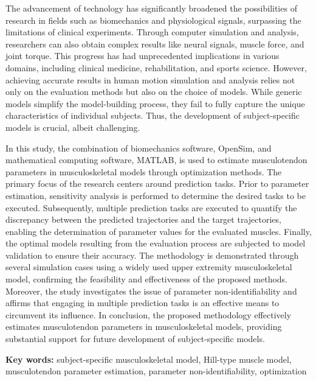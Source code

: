 \begin{abstractEN}

The advancement of technology has significantly broadened the possibilities of research in fields 
such as biomechanics and physiological signals, surpassing the limitations of clinical experiments. 
Through computer simulation and analysis, researchers can also obtain complex results like neural 
signals, muscle force, and joint torque. 
This progress has had unprecedented implications in various domains, including clinical medicine, 
rehabilitation, and sports science. 
However, achieving accurate results in human motion simulation and analysis relies not only on 
the evaluation methods but also on the choice of models. 
While generic models simplify the model-building process, they fail to fully capture the unique 
characteristics of individual subjects. 
Thus, the development of subject-specific models is crucial, albeit challenging.

In this study, the combination of biomechanics software, OpenSim, and mathematical 
computing software, MATLAB, is used to estimate musculotendon parameters in musculoskeletal models 
through optimization methods.
The primary focus of the research centers around prediction tasks. 
Prior to parameter estimation, sensitivity analysis is performed to determine the desired tasks to 
be executed. 
Subsequently, multiple prediction tasks are executed to quantify the discrepancy between the 
predicted trajectories and the target trajectories, enabling the determination of parameter 
values for the evaluated muscles.
Finally, the optimal models resulting from the evaluation process are subjected to model validation 
to ensure their accuracy.
The methodology is demonstrated through several simulation cases using a widely used upper extremity 
musculoskeletal model, confirming the feasibility and effectiveness of the proposed methods.
Moreover, the study investigates the issue of parameter non-identifiability and affirms that 
engaging in multiple prediction tasks is an effective means to circumvent its influence.
In conclusion, the proposed methodology effectively estimates musculotendon parameters in 
musculoskeletal models, providing substantial support for future development of subject-specific models.

\textbf{Key words:} subject-specific musculoskeletal model, Hill-type muscle model, musculotendon parameter estimation, parameter non-identifiability, optimization
\end{abstractEN}